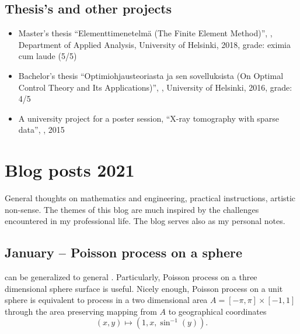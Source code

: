 \documentclass{article}
\begin{document}
        \subsection{Thesis's and other projects}
        \begin{itemize}
        \item Master's thesis ``Elementtimenetelmä (The Finite Element Method)'', , Department of Applied Analysis, University of Helsinki, 2018, grade: eximia cum laude (5/5)
        \item Bachelor's thesis ``Optimiohjausteoriasta ja sen sovelluksista (On Optimal Control Theory and Its Applications)'', , University of Helsinki, 2016, grade: 4/5          
        \item A university project for a poster session, ``X-ray tomography with sparse data'', , 2015
          
        \end{itemize}
        
        

        \section{Blog posts 2021}
        General thoughts on mathematics and engineering, practical instructions, artistic non-sense. The themes of this blog are much inspired by the challenges encountered in my professional life. The blog serves also as my personal notes.

        \subsection{January – Poisson process on a sphere}
         can be generalized to general . Particularly, Poisson process on a three dimensional sphere surface is useful. Nicely enough, Poisson process on a unit sphere is equivalent to process in a two dimensional area $ A = [-\pi,\pi] \times [-1,1]$ through the area preserving mapping from $A$ to geographical coordinates
        \begin{equation}
          (x,y) \mapsto (1,x,\sin^{-1}(y)) \nonumber.
        \end{equation}
\end{document}
